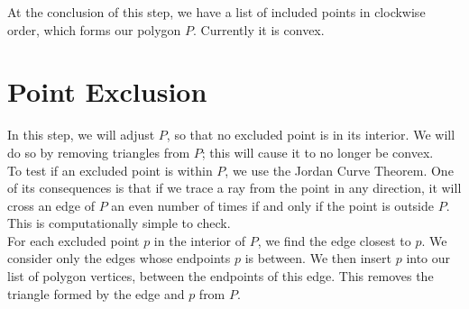 \documentclass[paper=a4, fontsize=11pt]{scrartcl} %
\numberwithin{equation}{section} %
\numberwithin{figure}{section} %
\numberwithin{table}{section} %
\begin{document}
At the conclusion of this step, we have a list of included points in clockwise
order, which forms our polygon $P$. Currently it is convex.

\section{Point Exclusion}
In this step, we will adjust $P$, so that no excluded point is in its interior.
We will do so by removing triangles from $P$; this will cause it to no longer be
convex. \\

To test if an excluded point is within $P$, we use the Jordan Curve Theorem. One
of its consequences is that if we trace a ray from the point in any direction,
it will cross an edge of $P$ an even number of times if and only if the point is
outside $P$.  This is computationally simple to check. \\

For each excluded point $p$ in the interior of $P$, we find the edge closest to
$p$. We consider only the edges whose endpoints $p$ is between.  We then insert
$p$ into our list of polygon vertices, between the endpoints of this edge. This
removes the triangle formed by the edge and $p$ from $P$. \\
\end{document}
